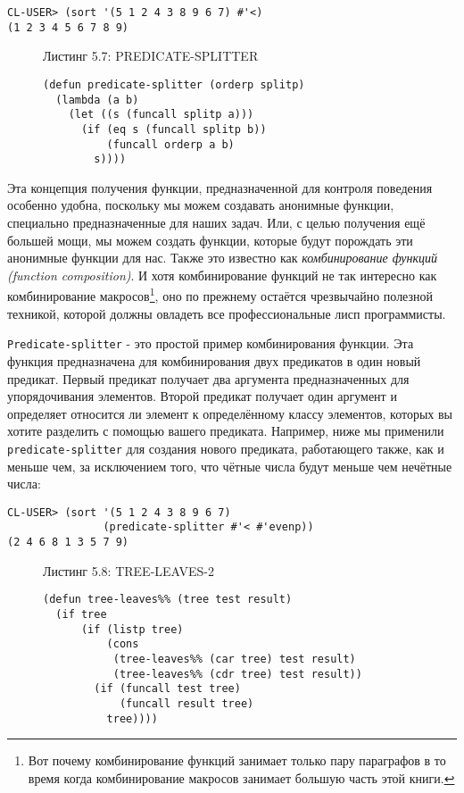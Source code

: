 \begin{verbatim}
CL-USER> (sort '(5 1 2 4 3 8 9 6 7) #'<)
(1 2 3 4 5 6 7 8 9)
\end{verbatim}

\begin{figure}Листинг 5.7: PREDICATE-SPLITTER\label{listing_5.7}
\listbegin
\begin{verbatim}
(defun predicate-splitter (orderp splitp)
  (lambda (a b)
    (let ((s (funcall splitp a)))
      (if (eq s (funcall splitp b))
          (funcall orderp a b)
        s))))
\end{verbatim}
\listend
\end{figure}

Эта концепция получения функции, предназначенной для контроля поведения особенно удобна, поскольку мы можем создавать анонимные функции, специально предназначенные для наших задач. Или, с целью получения ещё большей мощи, мы можем создать функции, которые будут порождать эти анонимные функции для нас. Также это известно как \emph{комбинирование функций (function composition)}. И хотя комбинирование функций не так интересно как комбинирование макросов\footnote{Вот почему комбинирование функций занимает только пару параграфов в то время когда комбинирование макросов занимает большую часть этой книги.}, оно по прежнему остаётся чрезвычайно полезной техникой, которой должны овладеть все профессиональные лисп программисты.



\verb"Predicate-splitter" - это простой пример комбинирования функции. Эта функция предназначена для комбинирования двух предикатов в один новый предикат. Первый предикат получает два аргумента предназначенных для упорядочивания элементов. Второй предикат получает один аргумент и определяет относится ли элемент к определённому классу элементов, которых вы хотите разделить с помощью вашего предиката. Например, ниже мы применили \verb"predicate-splitter" для создания нового предиката, работающего также, как и меньше чем, за исключением того, что чётные числа будут меньше чем нечётные числа:

\begin{verbatim}
CL-USER> (sort '(5 1 2 4 3 8 9 6 7)
               (predicate-splitter #'< #'evenp))
(2 4 6 8 1 3 5 7 9)
\end{verbatim}

\begin{figure}Листинг 5.8: TREE-LEAVES-2\label{listing_5.8}
\listbegin
\begin{verbatim}
(defun tree-leaves%% (tree test result)
  (if tree
      (if (listp tree)
          (cons
           (tree-leaves%% (car tree) test result)
           (tree-leaves%% (cdr tree) test result))
        (if (funcall test tree)
            (funcall result tree)
          tree))))
\end{verbatim}
\listend
\end{figure}


